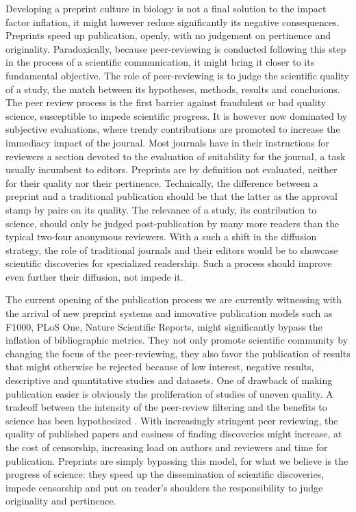 \documentclass[letterpaper,twocolumn,superscriptaddress,showkeys,longbibliography]{revtex4-1}
\begin{document}
Developing a preprint culture in biology is not a final solution to the impact
factor inflation, it might however reduce significantly its negative
consequences. Preprints speed up publication, openly, with no judgement on
pertinence and originality. Paradoxically, because peer-reviewing is conducted
following this step in the process of a scientific communication, it might bring
it closer to its fundamental objective. The role of peer-reviewing is to judge
the scientific quality of a study, the match between its hypotheses, methods,
results and conclusions. The peer review process is the first barrier against
fraudulent or bad quality science, susceptible to impede scientific progress. It
is however now dominated by subjective evaluations, where trendy contributions
are promoted to increase the immediacy impact of the journal. Most journals have
in their instructions for reviewers a section devoted to the evaluation of
suitability for the journal, a task usually incumbent to editors. Preprints are
by definition not evaluated, neither for their quality nor their pertinence.
Technically, the difference between a preprint and a traditional publication
should be that the latter as the approval stamp by pairs on its quality. The
relevance of a study, its contribution to science, should only be judged
post-publication by many more readers than the typical two-four anonymous
reviewers. With a such a shift in the diffusion strategy, the role of
traditional journals and their editors would be to showcase scientific
discoveries for specialized readership. Such a process should improve even
further their diffusion, not impede it. 

The current opening of the publication process we are currently witnessing with
the arrival of new preprint systems and innovative publication models such as
F1000, PLoS One, Nature Scientific Reports, might significantly bypass the
inflation of bibliographic metrics. They not only promote scientific community
by changing the focus of the peer-reviewing, they also favor the publication of
results that might otherwise be rejected because of low interest, negative
results, descriptive and quantitative studies and datasets. One of drawback of
making publication easier is obviously the proliferation of studies of uneven
quality. A tradeoff between the intensity of the peer-review filtering and the
benefits to science has been hypothesized \cite{Aarssen2012}. With increasingly
stringent peer reviewing, the quality of published papers and easiness of
finding discoveries might increase, at the cost of censorship, increasing load
on authors and reviewers and time for publication. Preprints are simply
bypassing this model, for what we believe is the progress of science: they speed
up the dissemination of scientific discoveries, impede censorship and put on
reader's shoulders the responsibility to judge originality and pertinence.
\end{document}
